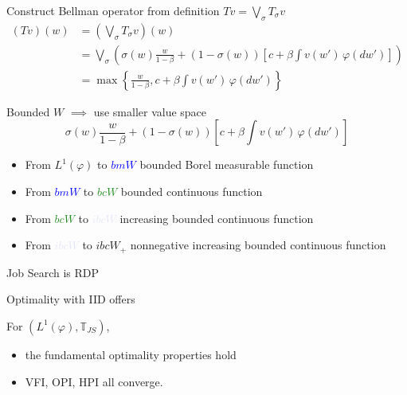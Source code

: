 \documentclass[aspectratio=169]{beamer} %
\begin{document}
\begin{frame}{Construct Bellman operator from definition}
    $Tv = \bigvee_\sigma T_\sigma v$
    \begin{align*}
        (Tv)(w) &= \left(\bigvee_\sigma T_\sigma v\right)(w)\\
        &= \bigvee_\sigma \left(\sigma(w) \frac{w}{1-\beta} + (1-\sigma(w))\left[c+\beta\int v(w')\, \varphi(dw')\right]\right)\\
        &= \max\left\{\frac{w}{1-\beta}, c+\beta\int v(w') \, \varphi(dw')\right\}
    \end{align*}
    
\end{frame}

\begin{frame}{Bounded $W$ $\implies$ use smaller value space}
$$
\sigma(w) \frac{w}{1-\beta} + (1-\sigma(w))\left[c+\beta\int v(w')\, \varphi(dw')\right]
$$
\begin{itemize}
    \item From $L^1(\varphi)$ to \textcolor{blue}{$bmW$} bounded Borel measurable function
    \item From \textcolor{blue}{$bmW$} to \textcolor{ForestGreen}{$bcW$} bounded continuous function
    \item From \textcolor{ForestGreen}{$bcW$} to \textcolor{Lavender}{$ibcW$} increasing bounded continuous function
    \item From \textcolor{Lavender}{$ibcW$} to \textcolor{RedOrange}{$ibcW_+$} nonnegative increasing bounded continuous function
\end{itemize}
\end{frame}

\begin{frame}{Job Search is RDP}
    
\end{frame}


\begin{frame}{Optimality with IID offers}
    \begin{proposition}
        For $(L^1(\varphi),\mathbb{T}_{JS})$,
        \begin{itemize}
            \item the fundamental optimality properties hold
            \item VFI, OPI, HPI all converge.
        \end{itemize}
    \end{proposition}
\end{frame}
\end{document}
